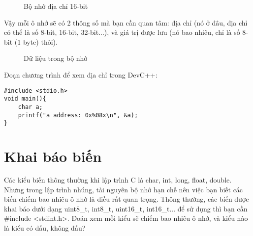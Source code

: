 \begin{figure}[h!]
\centering

\caption{Bộ nhớ địa chỉ 16-bit} 
\end{figure}

Vậy mỗi ô nhớ sẽ có 2 thông số mà bạn cần quan tâm: địa chỉ (nó ở đâu, địa chỉ có thể là số 8-bit, 16-bit, 32-bit...), và giá trị được lưu (nó bao nhiêu, chỉ là số 8-bit (1 byte) thôi).

\begin{figure}[h!]
\centering
{}
\caption{Dữ liệu trong bộ nhớ} %
\end{figure}



Đoạn chương trình để xem địa chỉ trong DevC++:\*
\begin{lstlisting}
#include <stdio.h>
void main(){
    char a;
    printf("a address: 0x%08x\n", &a);
}
\end{lstlisting}


\section{Khai báo biến}

Các kiểu biến thông thường khi lập trình C là char, int, long, float, double. Nhưng trong lập trình nhúng, tài nguyên bộ nhớ hạn chế nên việc bạn biết các biến chiếm bao nhiêu ô nhớ là điều rất quan trọng. Thông thường, các biến được khai báo dưới dạng uint8\_t, int8\_t, uint16\_t, int16\_t... để sử dụng thì bạn cần  \#include <stdint.h>. Đoán xem mỗi kiểu sẽ chiếm bao nhiêu ô nhớ, và kiểu nào là kiểu có dấu, không đấu?

